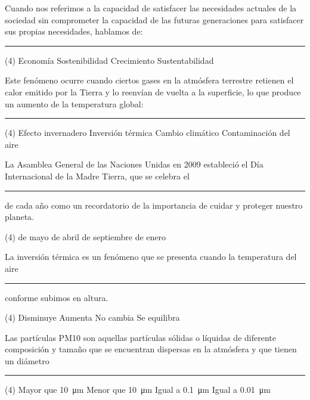 \documentclass[12pt, letter]{exam}
\begin{document}
\begin{questions}
    \question Cuando nos referimos a la capacidad de satisfacer las necesidades actuales de la sociedad sin comprometer la capacidad de las futuras generaciones para satisfacer sus propias necesidades, hablamos de: \rule{2cm}{0.1mm}
    \begin{tasks}(4)
        \task Economía
        \task Sostenibilidad
        \task Crecimiento
        \task Sustentabilidad
    \end{tasks}
    \question Este fenómeno ocurre cuando ciertos gases en la atmósfera terrestre retienen el calor emitido por la Tierra y lo reenvían de vuelta a la superficie, lo que produce un aumento de la temperatura global: \rule{2cm}{0.1mm}
    \begin{tasks}(4)
        \task Efecto invernadero
        \task Inversión térmica
        \task Cambio climático
        \task Contaminación del aire
    \end{tasks}
    \question La Asamblea General de las Naciones Unidas en 2009 estableció el Día Internacional de la Madre Tierra, que se celebra el \rule{2cm}{0.1mm} de cada año como un recordatorio de la importancia de cuidar y proteger nuestro planeta.
    \begin{tasks}(4)
         de mayo
         de abril
         de septiembre
         de enero
    \end{tasks}
    \question La inversión térmica es un fenómeno que se presenta cuando la temperatura del aire \rule{2cm}{0.1mm} conforme subimos en altura.
    \begin{tasks}(4)
        \task Disminuye
        \task Aumenta
        \task No cambia
        \task Se equilibra
    \end{tasks}
    \question Las partículas PM10 son aquellas partículas sólidas o líquidas de diferente composición y tamaño que se encuentran dispersas en la atmósfera y que tienen un diámetro \rule{2cm}{0.1mm}
    \begin{tasks}(4)
        \task Mayor que \SI{10}{\micro\meter}
        \task Menor que \SI{10}{\micro\meter}
        \task Igual a \SI{0.1}{\micro\meter}
        \task Igual a \SI{0.01}{\micro\meter}
    \end{tasks}
\end{questions}

\newpage
\end{document}
